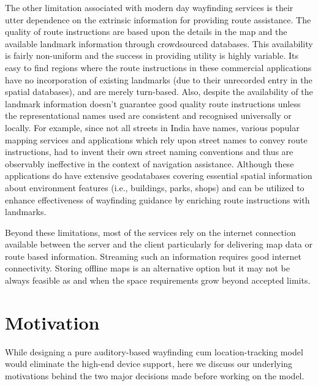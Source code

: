 \documentclass{iitkthesis}
\begin{document}
The other limitation associated with modern day wayfinding services is their utter dependence on the extrinsic information for providing route assistance. The quality of route instructions are based upon the details in the map and the available landmark information through crowdsourced databases. This availability is fairly non-uniform and the success in providing utility is highly variable. Its easy to find regions where the route instructions in these commercial applications have no incorporation of existing landmarks (due to their unrecorded entry in the spatial databases), and are merely turn-based. Also, despite the availability of the landmark information doesn't guarantee good quality route instructions unless the representational names used are consistent and recognised universally or locally. For example, since not all streets in India have names, various popular mapping services and applications which rely upon street names to convey route instructions, had to invent their own street naming conventions and thus are observably ineffective in the context of navigation assistance. Although these applications do have extensive geodatabases covering essential spatial information about environment features (i.e., buildings, parks, shops) and can be utilized to enhance effectiveness of wayfinding guidance by enriching route instructions with landmarks.

Beyond these limitations, most of the services rely on the internet connection available between the server and the client particularly for delivering map data or route based information. Streaming such an information requires good internet connectivity. Storing offline maps is an alternative option but it may not be always feasible as and when the space requirements grow beyond accepted limits.   


\section{Motivation}
While designing a pure auditory-based wayfinding cum location-tracking model would eliminate the high-end device support, here we discuss our underlying motivations behind the two major decisions made before working on the model.
\end{document}
